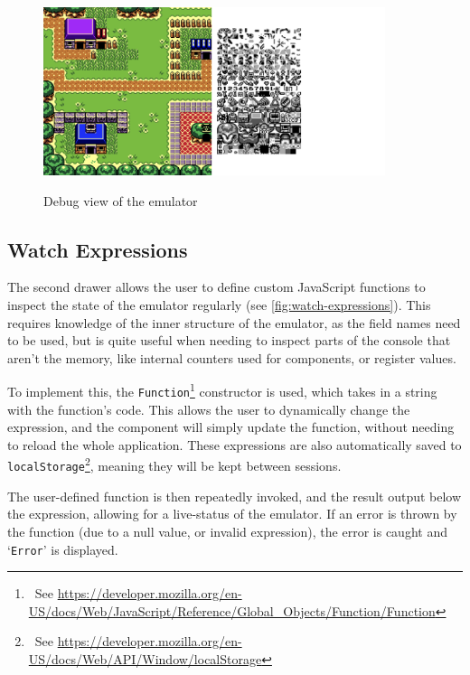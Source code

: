 \documentclass[11pt]{report}
\newcommand{\ftnt}[1]{\footnote{~See \url{#1}}}
\begin{document}
\begin{figure}[h]
    \centering
    \includegraphics[width=10cm]{images/debug-view}\\
    \caption{Debug view of the emulator}
    \label{fig:debug-view}
\end{figure}

\subsection{Watch Expressions}

The second drawer allows the user to define custom JavaScript functions to inspect the state of the emulator regularly (see \ref{fig:watch-expressions}). This requires knowledge of the inner structure of the emulator, as the field names need to be used, but is quite useful when needing to inspect parts of the console that aren't the memory, like internal counters used for components, or register values.

To implement this, the \texttt{Function}\ftnt{https://developer.mozilla.org/en-US/docs/Web/JavaScript/Reference/Global_Objects/Function/Function} constructor is used, which takes in a string with the function's code. This allows the user to dynamically change the expression, and the component will simply update the function, without needing to reload the whole application. These expressions are also automatically saved to \texttt{localStorage}\ftnt{https://developer.mozilla.org/en-US/docs/Web/API/Window/localStorage}, meaning they will be kept between sessions.

The user-defined function is then repeatedly invoked, and the result output below the expression, allowing for a live-status of the emulator. If an error is thrown by the function (due to a null value, or invalid expression), the error is caught and `\texttt{Error}' is displayed.
\end{document}
